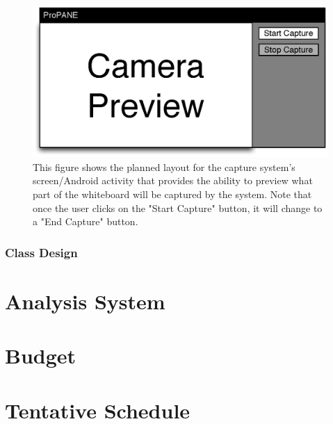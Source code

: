 \documentclass[]{article}
\begin{document}
					\begin{figure}
						\centering
						\includegraphics{images/app-preview-layout.eps}
						\caption{This figure shows the planned layout for the capture system's screen/Android activity that provides the ability to preview what part of the whiteboard will be captured by the system. Note that once the user clicks on the "Start Capture" button, it will change to a "End Capture" button.}
					\end{figure}
					
				\subsubsection{Class Design}
		
	
	\section{Analysis System}
	
	
	\section{Budget}
	
	
	\section{Tentative Schedule}
		
		
		
			
\end{document}
